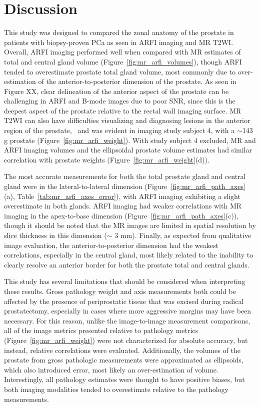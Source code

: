 \section{Discussion}\label{sect:discussion}

This study was designed to compared the zonal anatomy of the prostate in
patients with biopsy-proven PCa as seen in ARFI imaging and MR T2WI.  Overall,
ARFI imaging performed well when compared with MR estimates of total and
central gland volume (Figure~\ref{fig:mr_arfi_volumes}), though ARFI tended to
overestimate prostate total gland volume, most commonly due to over-estimation
of the anterior-to-posterior dimension of the prostate.  As seen in Figure XX,
clear delineation of the anterior aspect of the prostate can be challenging in
ARFI and B-mode images due to poor SNR, since this is the deepest aspect of the
prostate relative to the rectal wall imaging surface.  MR T2WI can also have
difficulties visualizing and diagnosing lesions in the anterior region of the
prostate,~\cite{Gupta2013} and was evident in imaging study subject 4, with a
$\sim$143 g prostate (Figure~\ref{fig:mr_arfi_weight}).  With study subject 4
excluded, MR and ARFI imaging volumes and the ellipsoidal prostate volume
estimates had similar correlation with prostate weights
(Figure~\ref{fig:mr_arfi_weight}(d)).

The most accurate measurements for both the total prostate gland and central
gland were in the lateral-to-lateral dimension
(Figure~\ref{fig:mr_arfi_path_axes}(a), Table~\ref{tab:mr_arfi_axes_error}),
with ARFI imaging exhibiting a slight overestimate in both glands.  ARFI
imaging had weaker correlations with MR imaging in the apex-to-base dimension
(Figure~\ref{fig:mr_arfi_path_axes}(c)), though it should be noted that the MR
images are limited in spatial resolution by slice thickness in this dimension
($\sim$ 3 mm).  Finally, as expected from qualitative image evaluation, the
anterior-to-posterior dimension had the weakest correlations, especially in
the central gland, most likely related to the inability to clearly resolve an
anterior border for both the prostate total and central glands.

This study has several limitations that should be considered when interpreting
these results.  Gross pathology weight and axis measurements both could be
affected by the presence of periprostatic tissue that was excised during
radical prostatectomy, especially in cases where more aggressive margins may
have been necessary.  For this reason, unlike the image-to-image measurement
comparisons, all of the image metrics presented relative to pathology metrics
(Figure~\ref{fig:mr_arfi_weight}) were not characterized for absolute accuracy,
but instead, relative correlations were evaluated.  Additionally, the volumes
of the prostate from gross pathologic measurements were approximated as
ellipsoids, which also introduced error, most likely an over-estimation of
volume.  Interestingly, all pathology estimates were thought to have positive
biases, but both imaging modalities tended to overestimate relative to the
pathology measurements.

